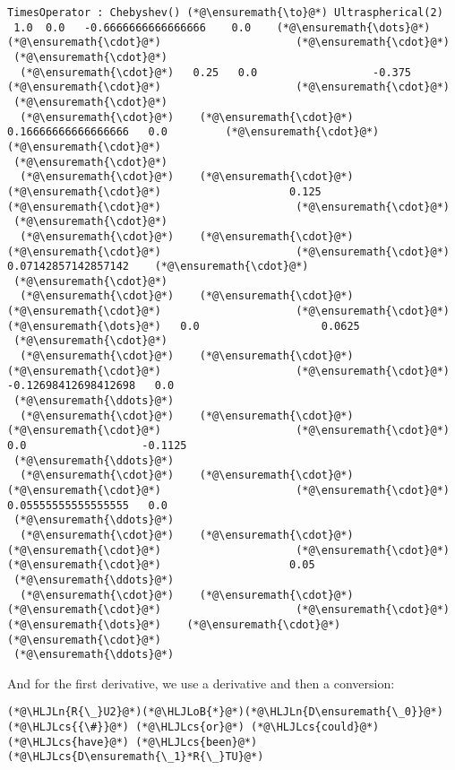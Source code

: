 \documentclass[12pt,a4paper]{article}
\newcommand{\HLJLn}[1]{#1}
\newcommand{\HLJLoB}[1]{\textcolor[RGB]{102,102,102}{\textbf{#1}}}
\newcommand{\HLJLcs}[1]{\textcolor[RGB]{153,153,119}{\textit{#1}}}
\begin{document}
\begin{lstlisting}
TimesOperator : Chebyshev() (*@\ensuremath{\to}@*) Ultraspherical(2)
 1.0  0.0   -0.6666666666666666    0.0    (*@\ensuremath{\dots}@*)    (*@\ensuremath{\cdot}@*)                     (*@\ensuremath{\cdot}@*)     
 (*@\ensuremath{\cdot}@*)
  (*@\ensuremath{\cdot}@*)   0.25   0.0                  -0.375       (*@\ensuremath{\cdot}@*)                     (*@\ensuremath{\cdot}@*)     
 (*@\ensuremath{\cdot}@*)
  (*@\ensuremath{\cdot}@*)    (*@\ensuremath{\cdot}@*)     0.16666666666666666   0.0         (*@\ensuremath{\cdot}@*)                     (*@\ensuremath{\cdot}@*)     
 (*@\ensuremath{\cdot}@*)
  (*@\ensuremath{\cdot}@*)    (*@\ensuremath{\cdot}@*)      (*@\ensuremath{\cdot}@*)                    0.125       (*@\ensuremath{\cdot}@*)                     (*@\ensuremath{\cdot}@*)     
 (*@\ensuremath{\cdot}@*)
  (*@\ensuremath{\cdot}@*)    (*@\ensuremath{\cdot}@*)      (*@\ensuremath{\cdot}@*)                     (*@\ensuremath{\cdot}@*)         0.07142857142857142    (*@\ensuremath{\cdot}@*)     
 (*@\ensuremath{\cdot}@*)
  (*@\ensuremath{\cdot}@*)    (*@\ensuremath{\cdot}@*)      (*@\ensuremath{\cdot}@*)                     (*@\ensuremath{\cdot}@*)     (*@\ensuremath{\dots}@*)   0.0                   0.0625 
 (*@\ensuremath{\cdot}@*)
  (*@\ensuremath{\cdot}@*)    (*@\ensuremath{\cdot}@*)      (*@\ensuremath{\cdot}@*)                     (*@\ensuremath{\cdot}@*)        -0.12698412698412698   0.0    
 (*@\ensuremath{\ddots}@*)
  (*@\ensuremath{\cdot}@*)    (*@\ensuremath{\cdot}@*)      (*@\ensuremath{\cdot}@*)                     (*@\ensuremath{\cdot}@*)         0.0                  -0.1125 
 (*@\ensuremath{\ddots}@*)
  (*@\ensuremath{\cdot}@*)    (*@\ensuremath{\cdot}@*)      (*@\ensuremath{\cdot}@*)                     (*@\ensuremath{\cdot}@*)         0.05555555555555555   0.0    
 (*@\ensuremath{\ddots}@*)
  (*@\ensuremath{\cdot}@*)    (*@\ensuremath{\cdot}@*)      (*@\ensuremath{\cdot}@*)                     (*@\ensuremath{\cdot}@*)          (*@\ensuremath{\cdot}@*)                    0.05   
 (*@\ensuremath{\ddots}@*)
  (*@\ensuremath{\cdot}@*)    (*@\ensuremath{\cdot}@*)      (*@\ensuremath{\cdot}@*)                     (*@\ensuremath{\cdot}@*)     (*@\ensuremath{\dots}@*)    (*@\ensuremath{\cdot}@*)                     (*@\ensuremath{\cdot}@*)     
 (*@\ensuremath{\ddots}@*)
\end{lstlisting}


And for the first derivative, we use a derivative and then a conversion:


\begin{lstlisting}
(*@\HLJLn{R{\_}U2}@*)(*@\HLJLoB{*}@*)(*@\HLJLn{D\ensuremath{\_0}}@*)  (*@\HLJLcs{{\#}}@*) (*@\HLJLcs{or}@*) (*@\HLJLcs{could}@*) (*@\HLJLcs{have}@*) (*@\HLJLcs{been}@*) (*@\HLJLcs{D\ensuremath{\_1}*R{\_}TU}@*)
\end{lstlisting}
\end{document}
